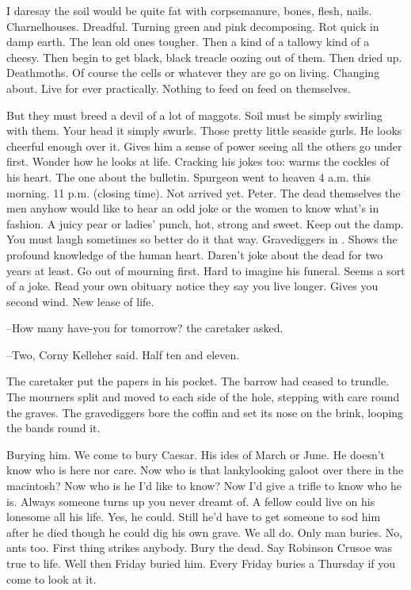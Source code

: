 I daresay the soil would be quite fat with corpsemanure, bones, flesh, nails.
Charnelhouses.
Dreadful.
Turning green and pink decomposing.
Rot quick in damp earth.
The lean old ones tougher.
Then a kind of a tallowy kind of a cheesy.
Then begin to get black, black treacle oozing out of them.
Then dried up.
Deathmoths.
Of course the cells or whatever they are go on living.
Changing about.
Live for ever practically.
Nothing to feed on
feed on themselves.

But they must breed a devil of a lot of maggots.
Soil must be simply swirling with them.
Your head it simply swurls.
Those pretty little seaside gurls.
He looks cheerful enough over it.
Gives him a sense of power seeing all the others go under first.
Wonder how he looks at life.
Cracking his jokes too:
warms the cockles of his heart.
The one about the bulletin.
Spurgeon went to heaven 4 a.m. this morning.
11 p.m. (closing time).
Not arrived yet.
Peter.
The dead themselves
the men anyhow would like to hear an odd joke
or the women to know what's in fashion.
A juicy pear or ladies' punch, hot, strong and sweet.
Keep out the damp.
You must laugh sometimes so better do it that way.
Gravediggers in .
Shows the profound knowledge of the human heart.
Daren't joke about the dead for two years at least.
Go out of mourning first.
Hard to imagine his funeral.
Seems a sort of a joke.
Read your own obituary notice they say you live longer.
Gives you second wind.
New lease of life.

--How many have-you for tomorrow?
the caretaker asked.

--Two,
Corny Kelleher said.
Half ten and eleven.

The caretaker put the papers in his pocket.
The barrow had ceased to trundle.
The mourners split and moved to each side of the hole,
stepping with care round the graves.
The gravediggers bore the coffin
and set its nose on the brink,
looping the bands round it.

Burying him.
We come to bury Caesar.
His ides of March or June.
He doesn't know who is here nor care.
Now who is that lankylooking galoot over there in the macintosh?
Now who is he I'd like to know?
Now I'd give a trifle to know who he is.
Always someone turns up you never dreamt of.
A fellow could live on his lonesome all his life.
Yes, he could.
Still he'd have to get someone to sod him after he died
though he could dig his own grave.
We all do.
Only man buries.
No, ants too.
First thing strikes anybody.
Bury the dead.
Say Robinson Crusoe was true to life.
Well then Friday buried him.
Every Friday buries a Thursday if you come to look at it.


